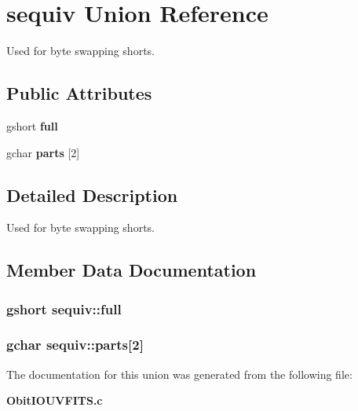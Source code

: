 \section{sequiv Union Reference}
\label{unionsequiv}
Used for byte swapping shorts.  


\subsection*{Public Attributes}
\begin{CompactItemize}
\item 
gshort {\bf full}
\item 
gchar {\bf parts} [2]
\end{CompactItemize}


\subsection{Detailed Description}
Used for byte swapping shorts. 



\subsection{Member Data Documentation}
\subsubsection{\setlength{\rightskip}{0pt plus 5cm}gshort {\bf sequiv::full}}\label{unionsequiv_o0}


\subsubsection{\setlength{\rightskip}{0pt plus 5cm}gchar {\bf sequiv::parts}[2]}\label{unionsequiv_o1}




The documentation for this union was generated from the following file:\begin{CompactItemize}
\item 
{\bf Obit\-IOUVFITS.c}\end{CompactItemize}

